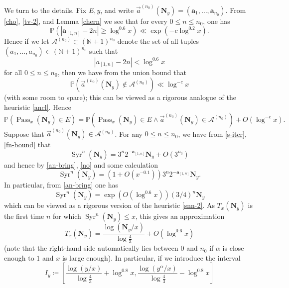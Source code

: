 \documentclass[12pt,a4paper,reqno]{amsart}
\numberwithin{equation}{section}
\theoremstyle{plain}
\theoremstyle{definition}
\renewcommand\P{\mathbb{P}}
\newcommand\N{\mathbb{N}}
\renewcommand\a{\mathbf{a}}
\newcommand\Pass{{\operatorname{Pass}}}
\newcommand\Syr{{\operatorname{Syr}}}
\begin{document}
We turn to the details.  Fix $E, y$, and write $\vec a^{(n_0)}(\mathbf{N}_y) = (\a_1,\dots,\a_{n_0})$.  From \eqref{cho}, \eqref{tv-2}, and Lemma \ref{chern} we see that for every $0 \leq n \leq n_0$, one has
$$ \P( |\a_{[1,n]} - 2n| \geq \log^{0.6} x ) \ll \exp( - c \log^{0.2} x ).$$
Hence if we let ${\mathcal A}^{(n_0)} \subset (\N+1)^{n_0}$ denote the set of all tuples $(a_1,\dots,a_{n_0}) \in (\N+1)^{n_0}$ such that
\begin{equation}\label{an-bring}
|a_{[1,n]} - 2n| < \log^{0.6} x
\end{equation}
for all $0 \leq n \leq n_0$,
then we have from the union bound that
\begin{equation}\label{lo}
 \P( \vec a^{(n_0)}(\mathbf{N}_y)  \not \in {\mathcal A}^{(n_0)} ) \ll \log^{-c} x 
\end{equation}
(with some room to spare); this can be viewed as a rigorous analogue of the heuristic \eqref{ancl}.  Hence 
$$  \P( \Pass_x( \mathbf{N}_y ) \in E )  =  \P( \Pass_x( \mathbf{N}_y ) \in E \wedge \vec a^{(n_0)}(\mathbf{N}_y) \in {\mathcal A}^{(n_0)} ) +   O( \log^{-c} x  ).$$
Suppose that $\vec a^{(n_0)}(\mathbf{N}_y) \in {\mathcal A}^{(n_0)}$.    For any $0 \leq n \leq n_0$, we have from \eqref{s-iter}, \eqref{fn-bound} that
$$
 \Syr^n(\mathbf{N}_y) = 3^{n} 2^{-\a_{[1,n]}} \mathbf{N}_y + O( 3^{n_0} ) $$
and hence by \eqref{an-bring}, \eqref{no} and some calculation
\begin{equation}\label{snny}
\Syr^n(\mathbf{N}_y) = (1 + O(x^{-0.1})) 3^{n} 2^{-\a_{[1,n]}} \mathbf{N}_y.
\end{equation}
In particular, from \eqref{an-bring} one has
\begin{equation}\label{anb}
\Syr^n(\mathbf{N}_y) = \exp( O( \log^{0.6} x)) (3/4)^n \mathbf{N}_y
\end{equation}
which can be viewed as a rigorous version of the heuristic \eqref{snn-2}.  As $T_x(\mathbf{N}_y)$ is the first time $n$ for which $\Syr^n(\mathbf{N}_y) \leq x$, this gives an approximation
\begin{equation}\label{txy}
 T_x(\mathbf{N}_y) = \frac{\log( \mathbf{N}_y / x )}{\log \frac{4}{3}} + O( \log^{0.6} x)
\end{equation}
(note that the right-hand side automatically lies between $0$ and $n_0$ if $\alpha$ is close enough to $1$ and $x$ is large enough).  In particular, if we introduce the interval
\begin{equation}\label{iy-def}
 I_y \coloneqq \left[\frac{\log( y / x )}{\log \frac{4}{3}} + \log^{0.8} x, \frac{\log( y^\alpha / x )}{\log \frac{4}{3}} - \log^{0.8} x\right]
\end{equation}
\end{document}

